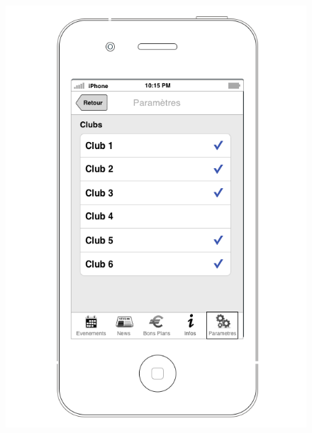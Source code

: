 \documentclass[a4paper, 11px]{article}
\begin{document}
\begin{figure}[htbp]
\begin{minipage}[c]{.50\linewidth}
\begin{center}
			\includegraphics[scale=0.3]{../../Sketch/iOS/parametres_detail.png}
		\end{center}
	\end{minipage}
\end{figure}
\vfill
\clearpage
\end{document}
